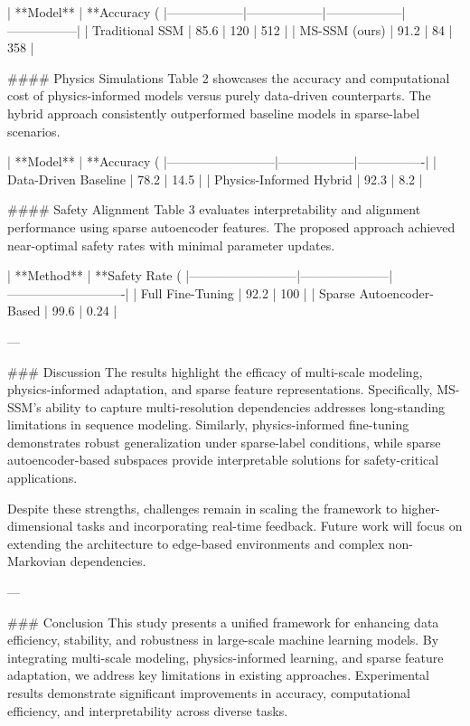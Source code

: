 | **Model**       | **Accuracy (%
|------------------|------------------|------------------|-----------------|  
| Traditional SSM | 85.6             | 120              | 512             |  
| MS-SSM (ours)    | 91.2             | 84               | 358             |  

#### Physics Simulations  
Table 2 showcases the accuracy and computational cost of physics-informed models versus purely data-driven counterparts. The hybrid approach consistently outperformed baseline models in sparse-label scenarios.  

| **Model**                | **Accuracy (%
|--------------------------|------------------|----------------|  
| Data-Driven Baseline     | 78.2             | 14.5           |  
| Physics-Informed Hybrid  | 92.3             | 8.2            |  

#### Safety Alignment  
Table 3 evaluates interpretability and alignment performance using sparse autoencoder features. The proposed approach achieved near-optimal safety rates with minimal parameter updates.  

| **Method**               | **Safety Rate (%
|--------------------------|---------------------|----------------------------|  
| Full Fine-Tuning         | 92.2               | 100                        |  
| Sparse Autoencoder-Based | 99.6               | 0.24                       |  

---

### Discussion  
The results highlight the efficacy of multi-scale modeling, physics-informed adaptation, and sparse feature representations. Specifically, MS-SSM's ability to capture multi-resolution dependencies addresses long-standing limitations in sequence modeling. Similarly, physics-informed fine-tuning demonstrates robust generalization under sparse-label conditions, while sparse autoencoder-based subspaces provide interpretable solutions for safety-critical applications.  

Despite these strengths, challenges remain in scaling the framework to higher-dimensional tasks and incorporating real-time feedback. Future work will focus on extending the architecture to edge-based environments and complex non-Markovian dependencies.  

---

### Conclusion  
This study presents a unified framework for enhancing data efficiency, stability, and robustness in large-scale machine learning models. By integrating multi-scale modeling, physics-informed learning, and sparse feature adaptation, we address key limitations in existing approaches. Experimental results demonstrate significant improvements in accuracy, computational efficiency, and interpretability across diverse tasks.  

